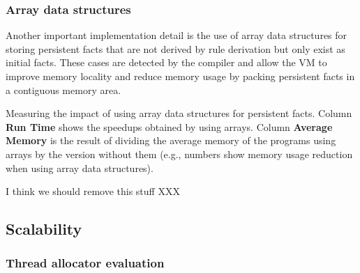 \subsubsection{Array data structures}

Another important implementation detail is the use of array data structures for
storing persistent facts that are not derived by rule derivation but only exist
as initial facts. These cases are detected by the compiler and allow the VM to
improve memory locality and reduce memory usage by packing persistent facts in a
contiguous memory area.

\begin{table}[ht]
   \begin{center}
      
   \end{center}

   \caption{Measuring the impact of using array data structures for persistent
      facts. Column \textbf{Run Time} shows the speedups obtained by using
      arrays. Column \textbf{Average Memory} is the result of dividing the
      average memory of the programs using arrays by the version without them
      (e.g., numbers show memory usage reduction when using array data
   structures).}

   \label{table:implementation:compare_arrays}
\end{table}

I think we should remove this stuff XXX

\subsection{Scalability}


\subsubsection{Thread allocator evaluation}

